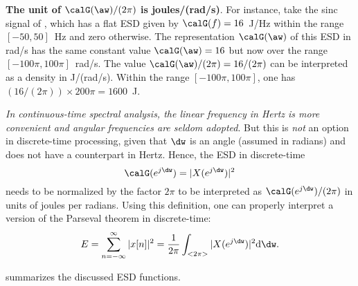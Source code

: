 \bExample \textbf{The unit of $\calG(\aw)/(2 \pi)$ is joules/(rad/s)}. 
\label{ex:units_of_esd_psd}
For instance, take the sinc signal of 
, which has a flat ESD given by 
$\calG(f)=16$~J/Hz within the 
range $[-50,50]$~Hz and zero otherwise. The representation $\calG(\aw)$ of this ESD in 
rad/s has the same constant value $\calG(\aw)=16$ but now over the range $[-100\pi,100\pi]$~rad/s. 
The value $\calG(\aw)/(2 \pi)=16/(2 \pi)$ can be interpreted as a density in J/(rad/s). 
Within the range $[-100\pi,100\pi]$, one has $(16/(2 \pi)) \times 200 \pi = 1600$~J.
\eExample




\emph{In continuous-time spectral analysis, the linear frequency in Hertz is more convenient and angular frequencies are seldom adopted}. But this is \emph{not} an option in discrete-time processing, given that $\dw$ is an angle (assumed in radians) and does not have a counterpart in Hertz. Hence, 
the ESD in discrete-time 
\begin{equation}
\calG(e^{j \dw})= |X(e^{j \dw})|^2
\end{equation}
needs to be normalized by the factor $2 \pi$ to be interpreted as $\calG(e^{j \dw})/(2 \pi)$ in units of joules per radians.
Using this definition, one can properly interpret a version of the Parseval theorem in discrete-time:
\begin{equation}
E = \sum_{n=-\infty}^{\infty} |x[n]|^2 = \frac{1}{2 \pi}\int_{<2 \pi>} |X(e^{j \dw})|^2 \textrm{d}\dw.
\label{eq:parseval_dt}
\end{equation}

 summarizes the discussed ESD functions.

